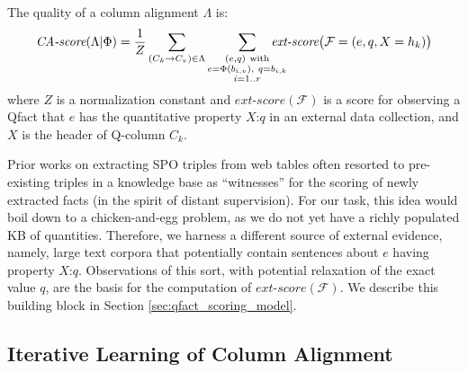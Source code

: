 
\vspace{0.1cm}
The quality of a column alignment $\Lambda$ is:
\[
\textit{CA-score}({\Lambda} | \Phi)
= \frac{1}{Z} 
\sum\limits_{({C}_{k} \rightarrow {C}_{v}) \in {\Lambda}}
\sum\limits_{\substack{(e,q) ~\text{with}\\
e = \Phi(b_{i,v}),~q = b_{i,k}\\
i = 1..r}}
\hspace{-0.5cm}
\textit{ext-score}\big(\mathcal{F} = (e,q,X = h_k)\big)
\]
where $Z$ is a normalization constant and 
$\textit{ext-score}(\mathcal{F})$ is a score for observing 
a Qfact that $e$ has the quantitative property $X$:$q$
in an external data collection, and $X$ is the header of Q-column $C_k$.

\vspace{0.1cm}
Prior works on extracting SPO triples from web tables
often resorted to pre-existing triples in a knowledge base
as ``witnesses'' for the scoring of newly extracted facts
(in the spirit of distant supervision).
For our task, this idea would boil down to a chicken-and-egg problem,
as we do not yet have a richly populated KB of quantities.
Therefore, we harness a different source of external evidence,
namely, large text corpora that potentially contain sentences
about $e$ having property $X$:$q$.
Observations of this sort, with potential relaxation of the exact value $q$, are the basis for the computation of 
$\textit{ext-score} (\mathcal{F})$.
We describe this building block in Section \ref{sec:qfact_scoring_model}.



\subsection{Iterative Learning of Column Alignment}
\label{subsec:jointELandCA}

